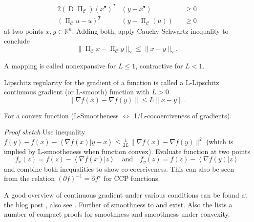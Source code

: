 \documentclass{article}
\DeclareMathOperator{\jacobian}{D}
\DeclareMathOperator{\proj}{\Pi}
\newcommand{\innerp}[2]{\left\langle #1 \vert #2 \right\rangle}
\newcommand{\optimal}[1]{{#1^{\scriptscriptstyle\bullet}}}
\begin{document}
\begin{definition}[label=5nalj3hx, name=Lipschitz Regularity]
\begin{example}[label=5pxh2ufj, name=Projections]
		\begin{alignat*}{2}
			(\jacobian\proj_{\mathcal C})(\optimal{x})^T&(y - \optimal{x}) &&\geq 0 \\
			(\proj_{\mathcal C}u - u)^T&(y - \proj_{\mathcal C}(u)) &&\geq 0
		\end{alignat*}
		at two points \(x,y\in\mathbb R^n\). Adding both, apply
		Cauchy-Schwartz inequality to conclude
		\[
			\lVert\proj_{\mathcal C}x - \proj_{\mathcal C}y\rVert_2 \leq \rVert x - y\rVert_2.
		\]
		
	\end{example}

	\begin{remark}[label=2s6tfa1j, name=Nonexpansive and Contractive Mappings]
		A mapping is called nonexpansive for \( L \leq 1 \), contractive
		for \( L < 1 \).
	\end{remark}
\end{definition}
\begin{definition}[label=ceh4aors, name=L-Smooth ({\textit or L-Lipschitz Continuous Gradient})]
	Lipschitz regularity for the gradient of a function is called a 
	L-Lipschitz continuous gradient (or L-smooth) function with \( L > 0\)
	\[
		\lVert\nabla f(x) - \nabla f(y)\rVert\leq L\lVert x - y\rVert.
	\]

	\begin{remark}[label=5vsiv5i2, name=Cocoerciveness of L-Smooth functions]
		For a convex function (L-Smootheness \( \Longleftrightarrow \)
		1/L-cocoerciveness of gradients).

		\textit{Proof sketch} Use inequality \(f(y)-f(x)-\innerp{\nabla
		f(x)}{y-x} \leq \frac{1}{2L}\lVert\nabla f(x) - \nabla
		f(y)\rVert^2\) (which is implied by L-smootheness when function
		convex). Evaluate function at two points
		\[
			f_x(z)= f(z) - \innerp{\nabla f(x)}{z} \quad \text{and}
			\quad f_y(z) = f(z) - \innerp{\nabla f(y)}{z}
		\]
		and combine both inequalities to show co-coerciveness. This can
		also be seen from the relation \( (\partial f)^{-1} = \partial f^\star\)
		for CCP functions.
	\end{remark}

	\begin{literature}[label=2tz2l_0t]
		A good overview of continuous gradient under various conditions can be found at the blog post \cite{zhou_continuous_gradient}, also see \cite[Appendix A][theorem.A.1.1]{acceleration_methods}. Further \cite[connections][theorem.3.4]{structured_nonconvex_functions} of smoothness to \cite[expected-smoothness][equation.3.13]{structured_nonconvex_functions} and \cite[expected residual][assumption.3.1]{structured_nonconvex_functions} exist. Also the \cite[Section 2.5][subsection.2.5]{garrigos2023handbook} lists a number of compact proofs for smoothness and smoothness under convexity.

	\end{literature}
\end{definition}
\end{document}
